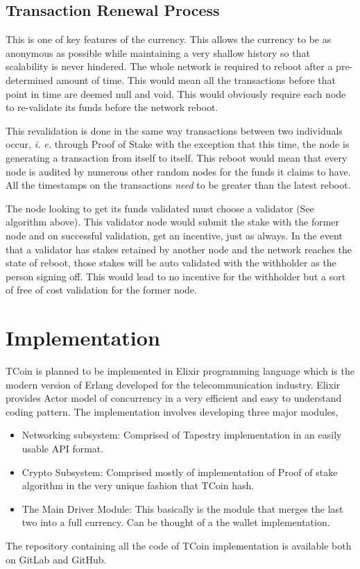 \documentclass[conference,a4paper,12pt]{IEEEtran}
\begin{document}
	\subsection{Transaction Renewal Process}
	
	This is one of key features of the currency. This allows the currency to be as anonymous as possible while maintaining a very shallow history so that scalability is never hindered. The whole network is required to reboot after a pre-determined amount of time. This would mean all the transactions before that point in time are deemed null and void. This would obviously require each node to re-validate its funds before the network reboot.

	This revalidation is done in the same way transactions between two individuals occur, \textit{i. e.} through Proof of Stake with the exception that this time, the node is generating a transaction from itself to itself. This reboot would mean that every node is audited by numerous other random nodes for the funds it claims to have. All the timestamps on the transactions \textit{need} to be greater than the latest reboot.

	The node looking to get its funds validated must choose a validator (See algorithm above). This validator node would submit the stake with the former node and on successful validation, get an incentive, just as always. In the event that a validator has stakes retained by another node and the network reaches the state of reboot, those stakes will be auto validated with the withholder as the person signing off. This would lead to no incentive for the withholder but a sort of free of cost validation for the former node.

\section{Implementation}

	TCoin is planned to be implemented in Elixir programming language \cite{elixir} which is the modern version of Erlang developed for the telecommunication industry. Elixir provides Actor model of concurrency in a very efficient and easy to understand coding pattern. The implementation involves developing three major modules,
	\begin{itemize}
	\item{Networking subsystem: }
	Comprised of Tapestry implementation in an easily usable API format.
	\item{Crypto Subsystem: }
	Comprised mostly of implementation of Proof of stake algorithm in the very unique fashion that TCoin hash.
	\item{The Main Driver Module: }
	This basically is the module that merges the last two into a full currency. Can be thought of a the wallet implementation.
	\end{itemize}
	The repository containing all the code of TCoin implementation is available both on GitLab\cite{gitlab} and GitHub\cite{github}.
	
\end{document}
